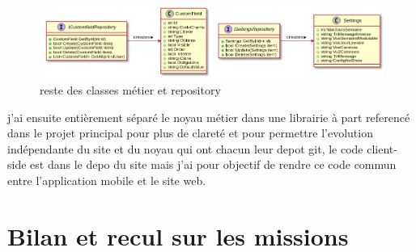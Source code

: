 \begin{figure}[h]
	\centering
	\includegraphics[width=1\linewidth]{Images/otherpersistence}
	\caption{reste des classes métier et repository}
	\label{fig:otherrepo}
\end{figure}


j'ai ensuite entièrement séparé le noyau métier dans une librairie à part referencé dans 
le projet principal pour plus de clareté et pour permettre l'evolution indépendante du site 
et du noyau qui ont chacun leur depot git, le code client-side est dans le depo du site 
mais j'ai pour objectif de rendre ce code commun entre l'application mobile et le site web.

\section{Bilan et recul sur les missions}
